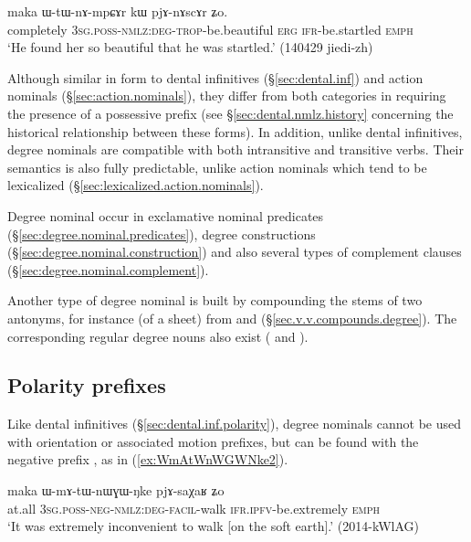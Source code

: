 \begin{exe}
\ex \label{ex:WtWnAmpCAr}
\gll  maka ɯ-tɯ-nɤ-mpɕɤr kɯ pjɤ-nɤscɤr ʑo. \\
completely  \textsc{3sg}.\textsc{poss}-\textsc{nmlz}:\textsc{deg}-\textsc{trop}-be.beautiful \textsc{erg} \textsc{ifr}-be.startled \textsc{emph} \\
\glt `He found her so beautiful that he was startled.' (140429 jiedi-zh)
\end{exe} 
 
Although similar in form to dental infinitives (§\ref{sec:dental.inf}) and action nominals (§\ref{sec:action.nominals}), they differ from both categories in requiring the presence of a possessive prefix (see §\ref{sec:dental.nmlz.history} concerning the historical relationship between these forms). In addition, unlike dental infinitives, degree nominals are compatible with both intransitive and transitive verbs. Their semantics is also fully predictable, unlike action nominals which tend to be lexicalized (§\ref{sec:lexicalized.action.nominals}).

Degree nominal occur in exclamative nominal predicates (§\ref{sec:degree.nominal.predicates}), degree constructions (§\ref{sec:degree.nominal.construction}) and also several types of complement clauses (§\ref{sec:degree.nominal.complement}).


Another type of degree nominal is built by compounding the stems of two antonyms, for instance  (of a sheet) from  and  (§\ref{sec.v.v.compounds.degree}). The corresponding regular degree nouns also exist ( and ).

\subsection{Polarity prefixes} \label{sec:degree.nominal.prefixes}
Like dental infinitives (§\ref{sec:dental.inf.polarity}), degree nominals cannot be used with orientation or associated motion prefixes, but can be found with the negative prefix , as in (\ref{ex:WmAtWnWGWNke2}).

 \begin{exe}
\ex \label{ex:WmAtWnWGWNke2}
\gll  maka ɯ-mɤ-tɯ-nɯɣɯ-ŋke pjɤ-saχaʁ ʑo \\
at.all \textsc{3sg}.\textsc{poss}-\textsc{neg}-\textsc{nmlz}:\textsc{deg}-\textsc{facil}-walk \textsc{ifr}.\textsc{ipfv}-be.extremely \textsc{emph} \\
\glt `It was extremely inconvenient to walk [on the soft earth].' (2014-kWlAG)
\end{exe}


